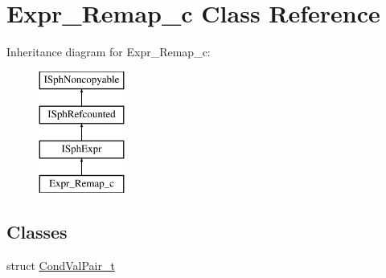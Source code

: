 \hypertarget{classExpr__Remap__c}{\section{Expr\-\_\-\-Remap\-\_\-c Class Reference}
\label{classExpr__Remap__c}
}
Inheritance diagram for Expr\-\_\-\-Remap\-\_\-c\-:\begin{figure}[H]
\begin{center}
\leavevmode
\includegraphics[height=4.000000cm]{classExpr__Remap__c}
\end{center}
\end{figure}
\subsection*{Classes}
\begin{DoxyCompactItemize}
\item 
struct \hyperlink{structExpr__Remap__c_1_1CondValPair__t}{Cond\-Val\-Pair\-\_\-t}
\end{DoxyCompactItemize}

